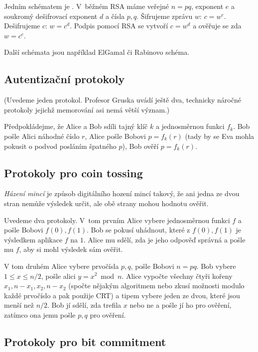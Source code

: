 Jedním schématem je . V~běžném RSA máme veřejné $n = pq$,
exponent $e$ a soukromý dešifrovací exponent $d$ a čísla $p,q$.
Šifrujeme zprávu $w$: $c = w^e$. Dešifrujeme $c$: $w = c^d$.
Podpis pomocí RSA se vytvoří $c = w^d$ a ověřuje se zda $w = c^e$.

Další schémata jsou například ElGamal či Rabinovo schéma.

\subsection{Autentizační protokoly}

(Uvedeme jeden protokol. Profesor Gruska uvádí ještě dva, technicky
náročné protokoly jejichž memorování asi nemá větší význam.)

\begin{example}
Předpokládejme, že Alice a Bob sdíli tajný klíč $k$ a jednosměrnou
funkci $f_k$. Bob pošle Alici náhodné číslo $r$, Alice pošle Bobovi
$p = f_k(r)$ (tady by se Eva mohla pokusit o podvod posláním špatného
$p$), Bob ověří $p = f_k(r)$.
\end{example}

\subsection{Protokoly pro coin tossing}

{\em Házení mincí} je způsob digitálního hození mincí takový, že ani
jedna ze dvou stran nemůže výsledek určit, ale obě strany mohou hodnotu
ověřit.

Uvedeme dva protokoly. V~tom prvním Alice vybere jednosměrnou funkci $f$
a pošle Bobovi $f(0), f(1)$. Bob se pokusí uhádnout, které z $f(0), f(1)$
je výsledkem aplikace $f$ na $1$. Alice mu sdělí, zda je jeho odpověď
správná a pošle mu $f$, aby si mohl výsledek sám ověřit.

V tom druhém Alice vybere prvočísla $p,q$, pošle Bobovi $n = pq$.
Bob vybere $1 \leq x \leq n/2$, pošle alici $y = x^2 \bmod n$.
Alice vypočte všechny čtyři kořeny $x_1, n-x_1, x_2, n - x_2$ (spočte
nějakým algoritmem nebo zkusí možnosti modulo každé prvočíslo a pak použije CRT)
a tipem vybere jeden ze dvou,
které jsou menší než $n/2$. Bob jí sdělí, zda trefila $x$ nebo ne a
pošle jí ho pro ověření, zatímco ona jemu pošle $p,q$ pro ověření.

\pagebreak

\subsection{Protokoly pro bit commitment}

